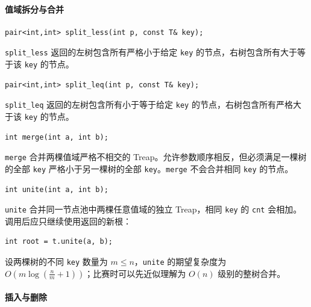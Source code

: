 \paragraph*{值域拆分与合并}

\begin{verbatim}
pair<int,int> split_less(int p, const T& key);
\end{verbatim}

\texttt{split\_less} 返回的左树包含所有严格小于给定 \texttt{key} 的节点，右树包含所有大于等于该 \texttt{key} 的节点。

\begin{verbatim}
pair<int,int> split_leq(int p, const T& key);
\end{verbatim}

\texttt{split\_leq} 返回的左树包含所有小于等于给定 \texttt{key} 的节点，右树包含所有严格大于该 \texttt{key} 的节点。

\begin{verbatim}
int merge(int a, int b);
\end{verbatim}

\texttt{merge} 合并两棵值域严格不相交的 Treap。允许参数顺序相反，但必须满足一棵树的全部 \texttt{key} 严格小于另一棵树的全部 \texttt{key}。\texttt{merge} 不会合并相同 \texttt{key} 的节点。

\begin{verbatim}
int unite(int a, int b);
\end{verbatim}

\texttt{unite} 合并同一节点池中两棵任意值域的独立 Treap，相同 \texttt{key} 的 \texttt{cnt} 会相加。调用后应只继续使用返回的新根：

\begin{verbatim}
int root = t.unite(a, b);
\end{verbatim}

设两棵树的不同 \texttt{key} 数量为 $m\le n$，\texttt{unite} 的期望复杂度为 $O\!\left(m\log\!\left(\frac{n}{m}+1\right)\right)$；比赛时可以先近似理解为 $O(n)$ 级别的整树合并。

\paragraph*{插入与删除}

